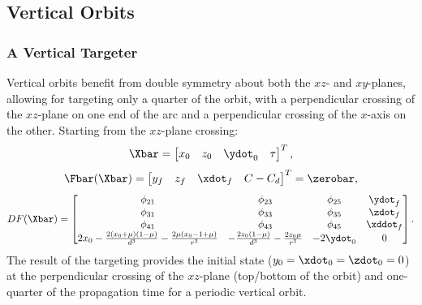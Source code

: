\subsection{Vertical Orbits}
\subsubsection{A Vertical Targeter}
Vertical orbits benefit from double symmetry about both the $xz$- and $xy$-planes, allowing for
targeting only a quarter of the orbit, with a perpendicular crossing of the $xz$-plane on one end
of the arc and a perpendicular crossing of the $x$-axis on the other. Starting from the $xz$-plane
crossing:
\begin{equation}
    \Xbar=\begin{bmatrix}   x_{0}   &   z_{0}   &   \ydot_{0}   &   \tau    \end{bmatrix}^{T},
    \label{eq:verticalfreevar}
\end{equation}
\vspace{1mm}
\begin{equation}
    \Fbar(\Xbar)=\begin{bmatrix}    y_{f}   &   z_{f}   &   \xdot_{f}   &   C-C_{d} \end{bmatrix}^{T}=\zerobar,
    \label{eq:verticalconst}
\end{equation}
\vspace{1mm}
\begin{equation}
    DF(\Xbar)=\begin{bmatrix}   \phi_{21}                                                                   &   \phi_{23}                                               &   \phi_{25}   &   \ydot_{f}   \\
                                \phi_{31}                                                                   &   \phi_{33}                                               &   \phi_{35}   &   \zdot_{f}   \\
                                \phi_{41}                                                                   &   \phi_{43}                                               &   \phi_{45}   &   \xddot_{f}  \\
                                2x_{0}-\frac{2(x_{0}+\mu)(1-\mu)}{d^{3}}-\frac{2\mu(x_{0}-1+\mu)}{r^{3}}    &   -\frac{2z_{0}(1-\mu)}{d^{3}}-\frac{2z_{0}\mu}{r^{3}}    &   -2\ydot_{0} &   0           \end{bmatrix}.
    \label{eq:verticaljacobian}
\end{equation}
The result of the targeting provides the initial state ($y_{0}=\xdot_{0}=\zdot_{0}=0$) at the
perpendicular crossing of the $xz$-plane (top/bottom of the orbit) and one-quarter of the
propagation time for a periodic vertical orbit.
\vspace{25mm}

